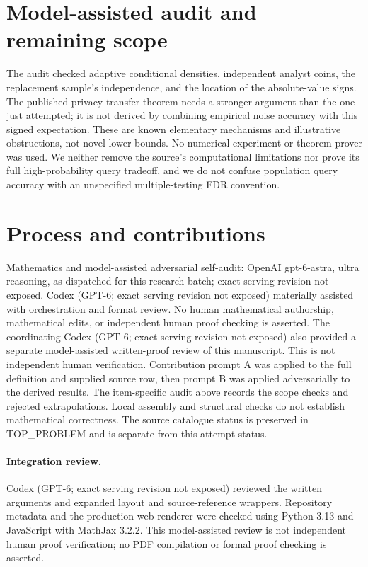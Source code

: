 \documentclass[11pt]{article}
\begin{document}
\section{Model-assisted audit and remaining scope}
The audit checked adaptive conditional densities, independent analyst
coins, the replacement sample's independence, and the location of the
absolute-value signs. The published privacy transfer theorem needs a
stronger argument than the one just attempted; it is not derived by
combining empirical noise accuracy with this signed expectation.
These are known elementary mechanisms and illustrative obstructions,
not novel lower bounds. No numerical experiment or theorem prover was
used. We neither remove the source's computational limitations nor prove
its full high-probability query tradeoff, and we do not confuse population
query accuracy with an unspecified multiple-testing FDR convention.

\section{Process and contributions}
Mathematics and model-assisted adversarial self-audit: OpenAI gpt-6-astra, ultra reasoning, as dispatched for this research batch; exact serving revision not exposed. Codex (GPT-6; exact serving revision not exposed) materially assisted with orchestration and format review. No human mathematical authorship, mathematical edits, or independent human proof checking is asserted.
The coordinating Codex (GPT-6; exact serving revision not exposed) also provided a separate model-assisted written-proof review of this manuscript. This is not independent human verification.
Contribution prompt A was applied to the full definition and supplied source row, then prompt B was applied adversarially to the derived results. The item-specific audit above records the scope checks and rejected extrapolations. Local assembly and structural checks do not establish mathematical correctness. The source catalogue status is preserved in TOP\_PROBLEM and is separate from this attempt status.
\paragraph{Integration review.} Codex (GPT-6; exact serving revision not exposed) reviewed the written arguments and expanded layout and source-reference wrappers. Repository metadata and the production web renderer were checked using Python 3.13 and JavaScript with MathJax 3.2.2. This model-assisted review is not independent human proof verification; no PDF compilation or formal proof checking is asserted.
\end{document}
